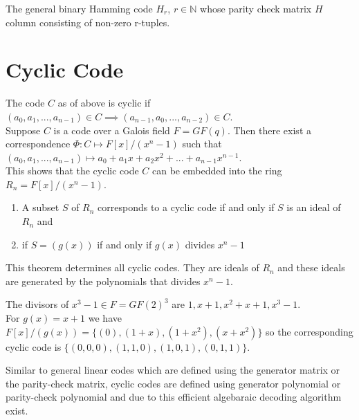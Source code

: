 \begin{example}
    The general binary Hamming code \(H_r\), \(r \in \mathbb{N}\) whose parity check matrix \(H\) column consisting of non-zero r-tuples.
\end{example}

\section{Cyclic Code}
The code \(C\) as of above is cyclic if \((a_0,a_1,...,a_{n-1}) \in C \implies (a_{n-1},a_0,...,a_{n-2}) \in C\).\\

Suppose \(C\) is a code over a Galois field \(F=GF(q)\). Then there exist a correspondence \(\Phi : C \mapsto F[x]/(x^n-1)\) such that \((a_0,a_1,...,a_{n-1})\longmapsto a_0+a_1x+a_2x^2+...+a_{n-1}x^{n-1}\).\\
This shows that the cyclic code \(C\) can be embedded into the ring \(R_n=F[x]/(x^n-1)\).

\begin{theorem}
\begin{enumerate}
    \item A subset \(S\) of \(R_n\) corresponds to a cyclic code if and only if \(S\) is an ideal of \(R_n\) and
    \item if \(S=(g(x))\) if and only if  \(g(x)\) divides \(x^n-1\)
    \end{enumerate}
\end{theorem}

This theorem determines all cyclic codes. They are ideals of \(R_n\) and these ideals are generated by the polynomials that divides \(x^n-1\).

\begin{example}
    The divisors of \(x^3-1 \in F=GF(2)^{3}\) are \(1, x+1, x^2+x+1, x^3-1\).\\
    For \(g(x)=x+1\) we have \(F[x]/(g(x))=\{(0),(1+x),(1+x^2),(x+x^2)\}\) so the corresponding cyclic code is \(\{(0,0,0),(1,1,0),(1,0,1),(0,1,1)\}\). 
\end{example}

Similar to general linear codes which are defined using the generator matrix or the parity-check matrix, cyclic codes are defined using generator polynomial or parity-check polynomial and due to this efficient algebaraic decoding algorithm exist.